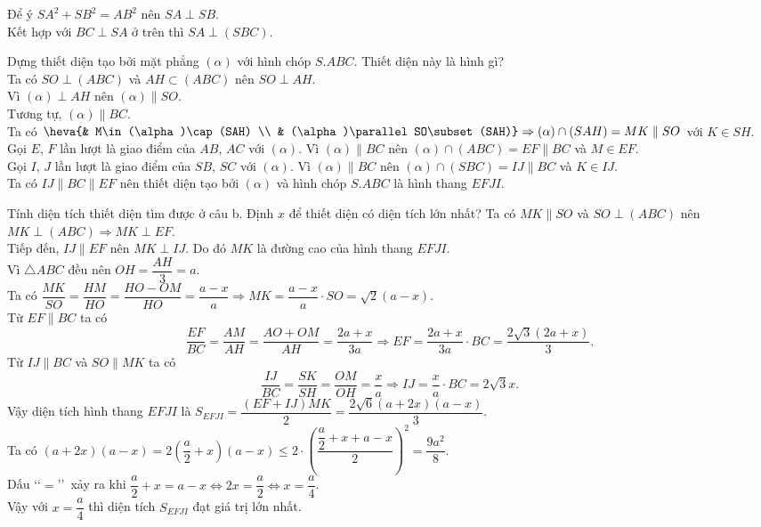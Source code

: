 \begin{vd}
{\begin{listEX}
{\begin{tikzpicture}[scale=1, font=\footnotesize, line join=round, line cap=round,>=stealth]
			\end{tikzpicture}}\noindent
			Để ý $SA^2+SB^2=AB^2$ nên $SA\perp SB$.\\
			Kết hợp với $BC\perp SA$ ở trên thì $SA\perp (SBC)$.
			\item Dựng thiết diện tạo bởi mặt phẳng $(\alpha)$ với hình chóp $S.ABC$. Thiết diện này là hình gì?\\
			Ta có $SO\perp (ABC)$ và $AH\subset (ABC)$ nên $SO\perp AH$.\\
			Vì $(\alpha)\perp AH$ nên $(\alpha)\parallel SO$.\\
			Tương tự, $(\alpha)\parallel BC$.\\
			Ta có $\heva{& M\in (\alpha)\cap (SAH) \\ & (\alpha)\parallel SO\subset (SAH)}\Rightarrow (\alpha)\cap (SAH)=MK\parallel SO$ với $K\in SH$.\\
			Gọi $E$, $F$ lần lượt là giao điểm của $AB$, $AC$ với $(\alpha)$. Vì $(\alpha)\parallel BC$ nên $(\alpha)\cap (ABC)=EF\parallel BC$ và $M\in EF$.\\
			Gọi $I$, $J$ lần lượt là giao điểm của $SB$, $SC$ với $(\alpha)$. Vì $(\alpha)\parallel BC$ nên $(\alpha)\cap (SBC)=IJ\parallel BC$ và $K\in IJ$.\\
			Ta có $IJ\parallel BC\parallel EF$ nên thiết diện tạo bởi $(\alpha)$ và hình chóp $S.ABC$ là hình thang $EFJI$.
			\item Tính diện tích thiết diện tìm được ở câu b. Định $x$ để thiết diện có diện tích lớn nhất?
			Ta có $MK\parallel SO$ và $SO\perp (ABC)$ nên $MK\perp (ABC)\Rightarrow MK\perp EF$.\\
			Tiếp đến, $IJ\parallel EF$ nên $MK\perp IJ$. Do đó $MK$ là đường cao của hình thang $EFJI$.\\
			Vì $\triangle ABC$ đều nên $OH=\dfrac{AH}{3}=a$.\\
			Ta có $\dfrac{MK}{SO}=\dfrac{HM}{HO}=\dfrac{HO-OM}{HO}=\dfrac{a-x}{a}\Rightarrow MK=\dfrac{a-x}{a}\cdot SO=\sqrt{2}(a-x)$.\\
			Từ $EF\parallel BC$ ta có $$\dfrac{EF}{BC}=\dfrac{AM}{AH}=\dfrac{AO+OM}{AH}=\dfrac{2a+x}{3a}\Rightarrow EF=\dfrac{2a+x}{3a}\cdot BC=\dfrac{2\sqrt{3}(2a+x)}{3}.$$
			Từ $IJ\parallel BC$ và $SO\parallel MK$ ta có $$\dfrac{IJ}{BC}=\dfrac{SK}{SH}=\dfrac{OM}{OH}=\dfrac{x}{a}\Rightarrow IJ=\dfrac{x}{a}\cdot BC=2\sqrt{3}x.$$
			Vậy diện tích hình thang $EFJI$ là $S_{EFJI}=\dfrac{(EF+IJ)MK}{2}=\dfrac{2\sqrt{6}(a+2x)(a-x)}{3}$.\\
			Ta có $(a+2x)(a-x)=2\left(\dfrac{a}{2}+x\right)(a-x)\leq 2\cdot\left(\dfrac{\dfrac{a}{2}+x+a-x}{2}\right)^2=\dfrac{9a^2}{8}$.\\
			Dấu \lq\lq  $=$\rq\rq\ xảy ra khi $\dfrac{a}{2}+x=a-x\Leftrightarrow 2x=\dfrac{a}{2}\Leftrightarrow x=\dfrac{a}{4}$.\\
			Vậy với $x=\dfrac{a}{4}$ thì diện tích $S_{EFJI}$ đạt giá trị lớn nhất.
		\end{listEX}
	}	
\end{vd}

